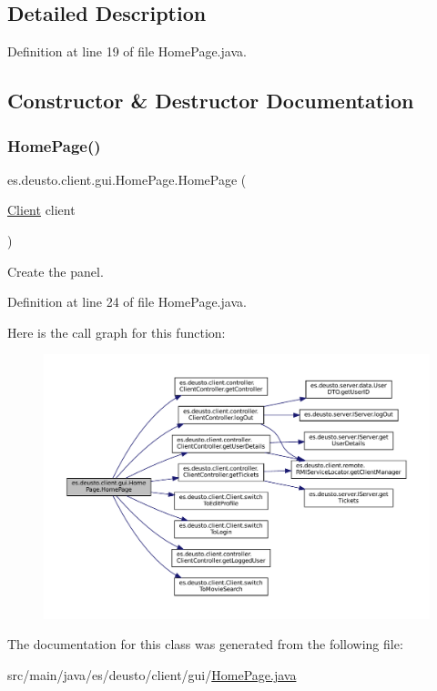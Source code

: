 \subsection{Detailed Description}


Definition at line 19 of file Home\+Page.\+java.



\subsection{Constructor \& Destructor Documentation}
\mbox{\label{classes_1_1deusto_1_1client_1_1gui_1_1_home_page_ada47f27769156f1d11578e12e651beed}} 
\subsubsection{\texorpdfstring{HomePage()}{HomePage()}}
{\footnotesize\ttfamily es.\+deusto.\+client.\+gui.\+Home\+Page.\+Home\+Page (\begin{DoxyParamCaption}\item[{\mbox{\hyperlink{classes_1_1deusto_1_1client_1_1_client}{Client}}}]{client }\end{DoxyParamCaption})}

Create the panel. 

Definition at line 24 of file Home\+Page.\+java.

Here is the call graph for this function\+:
\nopagebreak
\begin{figure}[H]
\begin{center}
\leavevmode
\includegraphics[width=350pt]{classes_1_1deusto_1_1client_1_1gui_1_1_home_page_ada47f27769156f1d11578e12e651beed_cgraph}
\end{center}
\end{figure}


The documentation for this class was generated from the following file\+:\begin{DoxyCompactItemize}
\item 
src/main/java/es/deusto/client/gui/\mbox{\hyperlink{_home_page_8java}{Home\+Page.\+java}}\end{DoxyCompactItemize}
